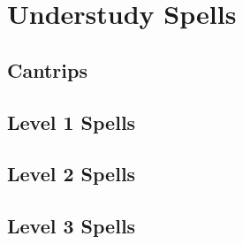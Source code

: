 \twocolumn
\section {Understudy Spells}
\subsection {Cantrips}



\subsection{Level 1 Spells}





\subsection{Level 2 Spells}



\subsection{Level 3 Spells}



